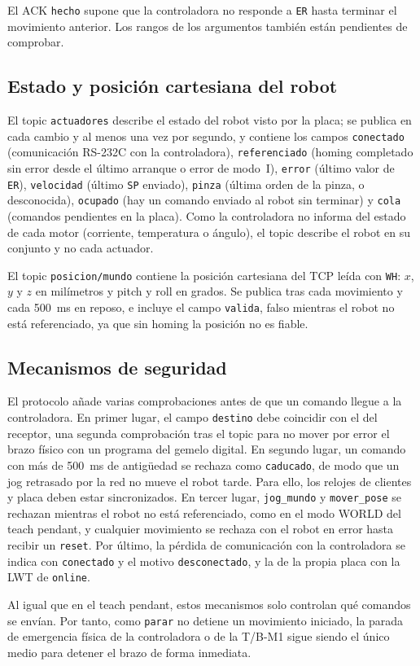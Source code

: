 El ACK \texttt{hecho} supone que la controladora no responde a \texttt{ER} hasta terminar el movimiento anterior.  Los rangos de los argumentos también están pendientes de comprobar. 

\subsection{Estado y posición cartesiana del robot}

El topic \texttt{actuadores} describe el estado del robot visto por la placa; se publica en cada cambio y al menos una vez por segundo, y contiene los campos \texttt{conectado} (comunicación RS-232C con la controladora), \texttt{referenciado} (homing completado sin error desde el último arranque o error de modo~I), \texttt{error} (último valor de \texttt{ER}), \texttt{velocidad} (último \texttt{SP} enviado), \texttt{pinza} (última orden de la pinza, o desconocida), \texttt{ocupado} (hay un comando enviado al robot sin terminar) y \texttt{cola} (comandos pendientes en la placa). Como la controladora no informa del estado de cada motor (corriente, temperatura o ángulo), el topic describe el robot en su conjunto y no cada actuador.

El topic \texttt{posicion/mundo} contiene la posición cartesiana del TCP leída con \texttt{WH}: $x$, $y$ y $z$ en milímetros y pitch y roll en grados. Se publica tras cada movimiento y cada 500~ms en reposo, e incluye el campo \texttt{valida}, falso mientras el robot no está referenciado, ya que sin homing la posición no es fiable. 

\subsection{Mecanismos de seguridad}

El protocolo añade varias comprobaciones antes de que un comando llegue a la controladora. En primer lugar, el campo \texttt{destino} debe coincidir con el del receptor, una segunda comprobación tras el topic para no mover por error el brazo físico con un programa del gemelo digital. En segundo lugar, un comando con más de 500~ms de antigüedad se rechaza como \texttt{caducado}, de modo que un jog retrasado por la red no mueve el robot tarde. Para ello, los relojes de clientes y placa deben estar sincronizados.  En tercer lugar, \texttt{jog\_mundo} y \texttt{mover\_pose} se rechazan mientras el robot no está referenciado, como en el modo WORLD del teach pendant, y cualquier movimiento se rechaza con el robot en error hasta recibir un \texttt{reset}. Por último, la pérdida de comunicación con la controladora se indica con \texttt{conectado} y el motivo \texttt{desconectado}, y la de la propia placa con la LWT de \texttt{online}.

Al igual que en el teach pendant, estos mecanismos solo controlan qué comandos se envían. Por tanto, como \texttt{parar} no detiene un movimiento iniciado, la parada de emergencia física de la controladora o de la T/B-M1 sigue siendo el único medio para detener el brazo de forma inmediata.
